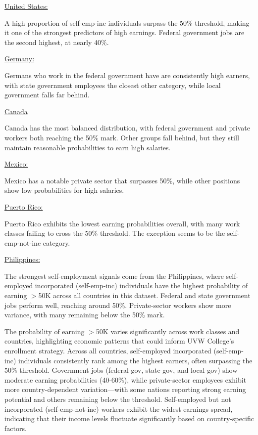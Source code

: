 \documentclass[journal,onecolumn]{IEEEtran}
\begin{document}
\medskip

\underline{United States:}

\par A high proportion of self-emp-inc individuals surpass the 50\% threshold, making it one of the strongest predictors of high earnings.
Federal government jobs are the second highest, at nearly 40\%.

\underline{Germany:}

\par Germans who work in the federal government have are consistently high earners, with state government
employees the closest other category, while local government falls far behind.

\underline{Canada}

\par Canada has the most balanced distribution, with federal government and private workers both reaching the 50\% mark. 
Other groups fall behind, but they still maintain reasonable probabilities to earn high salaries.

\underline{Mexico:}

Mexico has a notable private sector that surpasses 50\%, while other positions show low probabilities for high salaries.

\underline{Puerto Rico:}

\par Puerto Rico exhibits the lowest earning probabilities overall, with many work classes failing to cross the 50\% threshold.
The exception seems to be the self-emp-not-inc category.

\underline{Philippines:}
\par The strongest self-employment signals come from the Philippines, where self-employed incorporated (self-emp-inc) individuals have the highest probability of earning $>$50K across all countries in this dataset.
Federal and state government jobs perform well, reaching around 50\%. Private-sector workers show more variance, with many remaining below the 50\% mark.

\medskip

The probability of earning $>$50K varies significantly across work
classes and countries, highlighting economic patterns that could
inform UVW College’s enrollment strategy. Across all countries,
self-employed incorporated (self-emp-inc) individuals consistently
rank among the highest earners, often surpassing the 50\% threshold.
Government jobs (federal-gov, state-gov, and local-gov) show moderate
earning probabilities (40-60\%), while private-sector employees
exhibit more country-dependent variation—with some nations reporting
strong earning potential and others remaining below the threshold.
Self-employed but not incorporated (self-emp-not-inc) workers exhibit
the widest earnings spread, indicating that their income levels fluctuate significantly based on country-specific factors.
\end{document}
